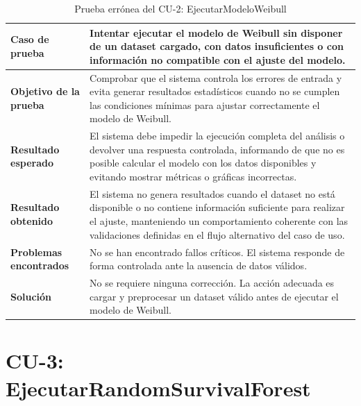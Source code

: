\begin{table}[H]
\centering
\small
\begin{tabularx}{\textwidth}{|p{}|X|}
\hline
\textbf{Caso de prueba} & Intentar ejecutar el modelo de Weibull sin disponer de un dataset cargado, con datos insuficientes o con información no compatible con el ajuste del modelo. \\ \hline
\textbf{Objetivo de la prueba} & Comprobar que el sistema controla los errores de entrada y evita generar resultados estadísticos cuando no se cumplen las condiciones mínimas para ajustar correctamente el modelo de Weibull. \\ \hline
\textbf{Resultado esperado} & El sistema debe impedir la ejecución completa del análisis o devolver una respuesta controlada, informando de que no es posible calcular el modelo con los datos disponibles y evitando mostrar métricas o gráficas incorrectas. \\ \hline
\textbf{Resultado obtenido} & El sistema no genera resultados cuando el dataset no está disponible o no contiene información suficiente para realizar el ajuste, manteniendo un comportamiento coherente con las validaciones definidas en el flujo alternativo del caso de uso. \\ \hline
\textbf{Problemas encontrados} & No se han encontrado fallos críticos. El sistema responde de forma controlada ante la ausencia de datos válidos. \\ \hline
\textbf{Solución} & No se requiere ninguna corrección. La acción adecuada es cargar y preprocesar un dataset válido antes de ejecutar el modelo de Weibull. \\ \hline
\end{tabularx}
\caption{Prueba errónea del CU-2: EjecutarModeloWeibull}
\label{tab:prueba_erronea_cu2}
\normalsize
\end{table}

\Needspace{0.80\textheight}
\section{CU-3: EjecutarRandomSurvivalForest}



